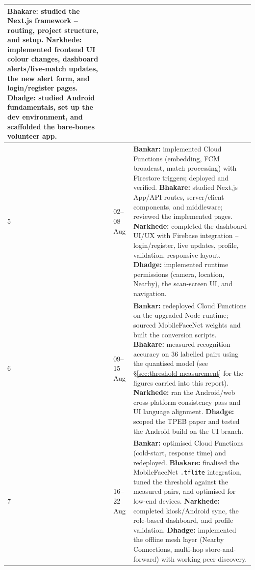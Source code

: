 \documentclass[12pt,a4paper,oneside]{report}
\newcommand{\code}[1]{\texttt{#1}}
\begin{document}
\begin{longtable}{|p{0.9cm}|p{2.1cm}|p{10.7cm}|}
\textbf{Bhakare:} studied the Next.js framework -- routing, project structure, and setup.\newline
\textbf{Narkhede:} implemented frontend UI colour changes, dashboard alerts/live-match updates, the new alert form, and login/register pages.\newline
\textbf{Dhadge:} studied Android fundamentals, set up the dev environment, and scaffolded the bare-bones volunteer app. \\ \hline
5 & 02--08 Aug &
\textbf{Bankar:} implemented Cloud Functions (embedding, FCM broadcast, match processing) with Firestore triggers; deployed and verified.\newline
\textbf{Bhakare:} studied Next.js App/API routes, server/client components, and middleware; reviewed the implemented pages.\newline
\textbf{Narkhede:} completed the dashboard UI/UX with Firebase integration -- login/register, live updates, profile, validation, responsive layout.\newline
\textbf{Dhadge:} implemented runtime permissions (camera, location, Nearby), the scan-screen UI, and navigation. \\ \hline
6 & 09--15 Aug &
\textbf{Bankar:} redeployed Cloud Functions on the upgraded Node runtime; sourced MobileFaceNet weights and built the conversion scripts.\newline
\textbf{Bhakare:} measured recognition accuracy on 36 labelled pairs using the quantised model (see \S\ref{sec:threshold-measurement} for the figures carried into this report).\newline
\textbf{Narkhede:} ran the Android/web cross-platform consistency pass and UI language alignment.\newline
\textbf{Dhadge:} scoped the TPEB paper and tested the Android build on the UI branch. \\ \hline
7 & 16--22 Aug &
\textbf{Bankar:} optimised Cloud Functions (cold-start, response time) and redeployed.\newline
\textbf{Bhakare:} finalised the MobileFaceNet \code{.tflite} integration, tuned the threshold against the measured pairs, and optimised for low-end devices.\newline
\textbf{Narkhede:} completed kiosk/Android sync, the role-based dashboard, and profile validation.\newline
\textbf{Dhadge:} implemented the offline mesh layer (Nearby Connections, multi-hop store-and-forward) with working peer discovery. \\ \hline

\end{longtable}
\end{document}
